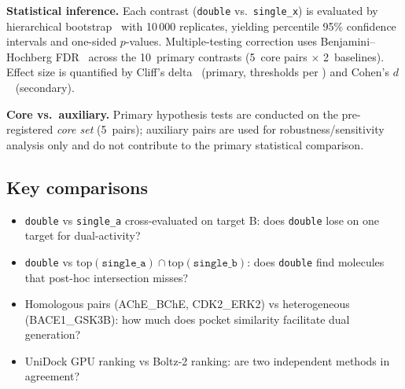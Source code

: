 \textbf{Statistical inference.} Each contrast (\texttt{double} vs.\
\texttt{single\_x}) is evaluated by hierarchical
bootstrap~\citep{cameron2008bootstrap, efron1993bootstrap} with 10\,000
replicates, yielding percentile 95\% confidence intervals and one-sided
$p$-values.  Multiple-testing correction uses
Benjamini--Hochberg FDR~\citep{benjamini1995fdr} across the 10~primary
contrasts (5~core pairs $\times$ 2~baselines).  Effect size is
quantified by Cliff's delta~\citep{cliff1993dominance} (primary,
thresholds per \citet{romano2006ordinal}) and Cohen's
$d$~\citep{cohen1988statistical} (secondary).

\textbf{Core vs.\ auxiliary.} Primary hypothesis tests are conducted on the
pre-registered \emph{core set} (5~pairs); auxiliary pairs are used for
robustness/sensitivity analysis only and do not contribute to the primary
statistical comparison.

\subsection*{Key comparisons}

\begin{itemize}
\item \texttt{double} vs \texttt{single\_a} cross-evaluated on target B:
  does \texttt{double} lose on one target for dual-activity?
\item \texttt{double} vs $\text{top}(\texttt{single\_a}) \cap \text{top}(\texttt{single\_b})$:
  does \texttt{double} find molecules that post-hoc intersection misses?
\item Homologous pairs (AChE\_BChE, CDK2\_ERK2) vs heterogeneous (BACE1\_GSK3B):
  how much does pocket similarity facilitate dual generation?
\item UniDock GPU ranking vs Boltz-2 ranking: are two independent methods in agreement?
\end{itemize}
